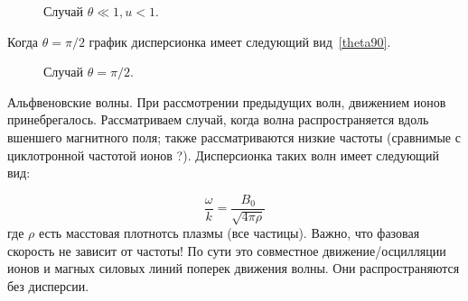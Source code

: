 \documentclass[10pt, a4paper]{article}
\begin{document}
\begin{figure}[h!]
    \caption{\label{theta-small-u-more-1} Случай $\theta\ll1, u < 1$.}
\end{figure}

Когда $\theta=\pi/2$ график дисперсионка имеет следующий вид~\ref{theta90}.
\begin{figure}[h!]
    \caption{\label{theta-90} Случай $\theta=\pi/2$.}
\end{figure}

Альфвеновские волны. При рассмотрении предыдущих волн, движением ионов принебрегалось. Рассматриваем случай, когда волна распространяется вдоль вшеншего магнитного поля; также рассматриваются низкие частоты (сравнимые с циклотронной частотой ионов ?). Дисперсионка таких волн имеет следующий вид:

\begin{equation}
    \label{alfven}
    \frac{\omega}{k}=\frac{B_0}{\sqrt{4\pi \rho}}
\end{equation}
где $\rho$ есть масстовая плотнотсь плазмы (все частицы). Важно, что фазовая скорость не зависит от частоты! По сути это совместное движение/осцилляции ионов и магных силовых линий поперек движения волны. Они распространяются без дисперсии.
\end{document}
